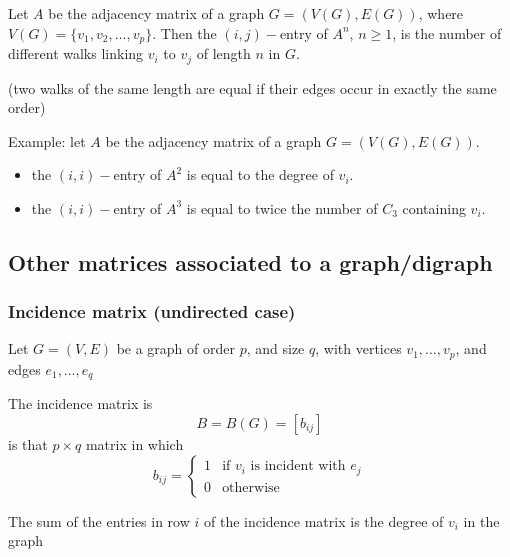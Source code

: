 \documentclass[aspectratio=169]{beamer}\usepackage[]{graphicx}\usepackage[]{xcolor}
\begin{document}
\begin{frame}
	\begin{theorem}
		Let $A$ be the adjacency matrix of a graph $G=(V(G),E(G))$, where $V(G)=\{v_1,v_2, \dots , v_p\}$. Then the $(i,j)-$entry of $A^n$, $n\geq 1$, is the number of different walks linking $v_i$ to $v_j$ of length $n$ in $G$.
	\end{theorem}
	(two walks of the same length are equal if their edges occur in exactly the same order)
	
	Example: let $A$ be the adjacency matrix of a graph $G=(V(G),E(G))$. 
	\begin{itemize}
		\item the $(i,i)-$entry of $A^2$ is equal to the degree of $v_i$.
		\item the $(i,i)-$entry of $A^3$ is equal to twice the number of $C_3$ containing $v_i$.
	\end{itemize}
\end{frame}


\subsection{Other matrices associated to a graph/digraph}

\begin{frame}\frametitle{Incidence matrix (undirected case)}
	Let $G=(V,E)$ be a graph of order $p$, and size $q$, with vertices $v_1, \ldots , v_p$, and edges $e_1, \ldots , e_q$
	\begin{definition}
		The incidence matrix is $$B=B(G)=[b_{ij}]$$ is that $p\times q$ matrix in which
		$$b_{ij}=\left \{ 
		\begin{array}{cc}
			1 & \textrm{if } v_i \textrm{ is incident with } e_j\\
			0 & \textrm{otherwise}
		\end{array}
		\right .
		$$
	\end{definition}
	\begin{theorem}
		The sum of the entries in row $i$ of the incidence matrix is the degree of $v_i$ in the graph
	\end{theorem}
\end{frame}
\end{document}
